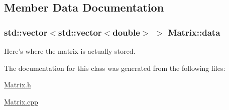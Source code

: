 \subsection{Member Data Documentation}
\hypertarget{class_matrix_adab4557133e13b08ae470a8e5df7b99c}{
\subsubsection[{data}]{\setlength{\rightskip}{0pt plus 5cm}std::vector$<$std::vector$<$double$>$ $>$ {\bf Matrix::data}}}
\label{class_matrix_adab4557133e13b08ae470a8e5df7b99c}


Here's where the matrix is actually stored. 



The documentation for this class was generated from the following files:\begin{DoxyCompactItemize}
\item 
\hyperlink{_matrix_8h}{Matrix.h}\item 
\hyperlink{_matrix_8cpp}{Matrix.cpp}\end{DoxyCompactItemize}
